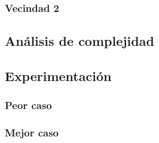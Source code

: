 % 		
% 		
% 		
\subsubsection{Vecindad 2}

\subsection{Análisis de complejidad}






\subsection{Experimentación}


\subsubsection{Peor caso}



\subsubsection{Mejor caso}
